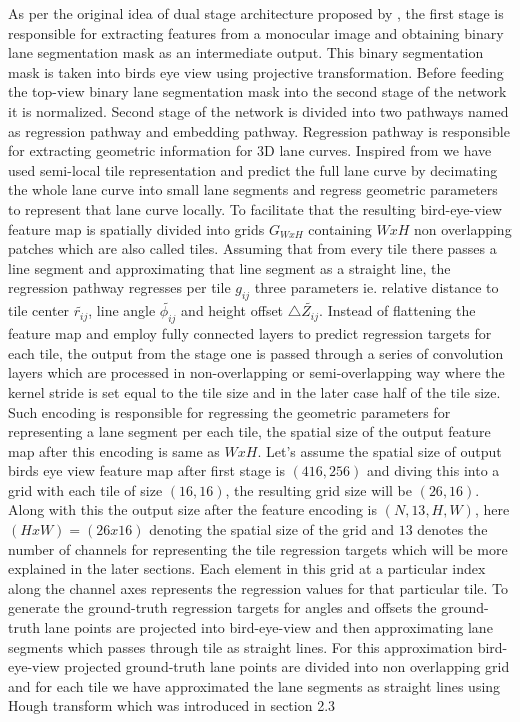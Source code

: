      As per the original idea of dual stage architecture proposed by \cite{guo2020gen}, the first stage is responsible for extracting features from a monocular image and obtaining binary lane segmentation mask as an intermediate output. This binary segmentation mask is taken into birds eye view using projective transformation. Before feeding the top-view binary lane segmentation mask into the second stage of the network it is normalized. Second stage of the network is divided into two pathways named as regression pathway and embedding pathway. Regression pathway is responsible for extracting geometric information for 3D lane curves. Inspired from \cite{DBLP:journals/corr/abs-2011-01535} we have used semi-local tile representation and predict the full lane curve by decimating the whole lane curve into small lane segments and regress geometric parameters to represent that lane curve locally. To facilitate that the resulting bird-eye-view feature map is spatially divided into grids $G_{WxH}$ containing $WxH$ non overlapping patches which are also called tiles. Assuming that from every tile there passes a line segment and approximating that line segment as a straight line, the regression pathway regresses per tile $g_{ij}$ three parameters ie. relative distance to tile center $\widetilde{r_{ij}}$, line angle $\widetilde{\phi_{ij}}$ and height offset $\triangle \widetilde{Z_{ij}}$. Instead of flattening the feature map and employ fully connected layers to predict regression targets for each tile, the output from the stage one is passed through a series of convolution layers which are processed in non-overlapping or semi-overlapping way where the kernel stride is set equal to the tile size and in the later case half of the tile size. Such encoding is responsible for regressing the geometric parameters for representing a lane segment per each tile, the spatial size of the output feature map after this encoding is same as $WxH$. Let's assume the spatial size of output birds eye view feature map after first stage is $(416,256)$ and diving this into a grid with each tile of size $(16,16)$, the resulting grid size will be $(26,16)$. Along with this the output size after the feature encoding is $(N, 13, H, W)$, here $(HxW) = (26x16)$ denoting the spatial size of the grid and $13$ denotes the number of channels for representing the tile regression targets which will be more explained in the later sections. Each element in this grid at a particular index along the channel axes represents the regression values for that particular tile. To generate the ground-truth regression targets for  angles and offsets the ground-truth lane points are projected into bird-eye-view and then approximating lane segments which passes through tile as straight lines. For this approximation bird-eye-view projected ground-truth lane points are divided into non overlapping grid and for each tile we have approximated the lane segments as straight lines using Hough transform which was introduced in section 2.3 
     
